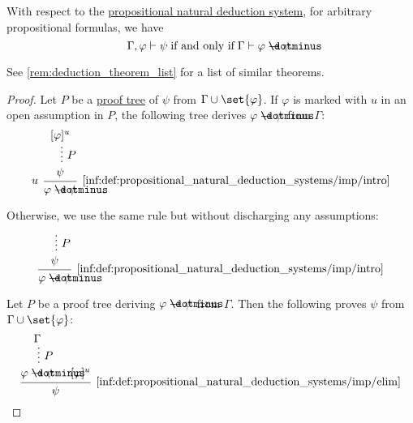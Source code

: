 \begin{theorem}\label{thm:propositional_syntactic_deduction_theorem}
  With respect to the \hyperref[def:abstract_natural_deduction_system]{propositional natural deduction system}, for arbitrary propositional formulas, we have
  \begin{equation*}
    \Gamma, \varphi \vdash \psi \T{if and only if} \Gamma \vdash \varphi \synimplies \psi.
  \end{equation*}
\end{theorem}
\begin{comments}
  \item See \cref{rem:deduction_theorem_list} for a list of similar theorems.
\end{comments}
\begin{proof}
  \SufficiencySubProof Let \( P \) be a \hyperref[def:propositional_natural_deduction_proof_tree]{proof tree} of \( \psi \) from \( \Gamma \cup \set{ \varphi } \). If \( \varphi \) is marked with \( u \) in an open assumption in \( P \), the following tree derives \( \varphi \synimplies \psi \) from \( \Gamma \):
  \begin{equation*}
    \begin{prooftree}
      \hypo{ [\varphi]^u }
      \ellipsis { \( P \) } { \psi }
      \infer[left label=\( u \)]1[\ref{inf:def:propositional_natural_deduction_systems/imp/intro}]{ \varphi \synimplies \psi }
    \end{prooftree}
  \end{equation*}

  Otherwise, we use the same rule but without discharging any assumptions:
  \begin{equation*}
    \begin{prooftree}
      \hypo{}
      \ellipsis { \( P \) } { \psi }
      \infer1[\ref{inf:def:propositional_natural_deduction_systems/imp/intro}]{ \varphi \synimplies \psi }
    \end{prooftree}
  \end{equation*}

  \NecessitySubProof Let \( P \) be a proof tree deriving \( \varphi \synimplies \psi \) from \( \Gamma \). Then the following proves \( \psi \) from \( \Gamma \cup \set{ \varphi } \):
  \begin{equation*}
    \begin{prooftree}
      \hypo {\Gamma}
      \ellipsis { \( P \) } { \varphi \synimplies \psi }

      \hypo { [\varphi]^u }
      \infer2[\ref{inf:def:propositional_natural_deduction_systems/imp/elim}]{ \psi }
    \end{prooftree}
  \end{equation*}
\end{proof}

